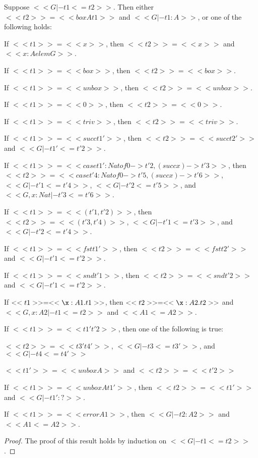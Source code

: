 \begin{lemma}
  \label{lemma:inversion_for_term_precision_for_core_grady}
  Suppose $<<G |- t1 <= t2>>$.  Then either $<<t2>> = <<box A t1>>$ and $<<G |- t1 : A>>$, or
  one of the following holds:
  \begin{enumR} \small
  \item If $<<t1>> = <<x>>$, then $<<t2>> = <<x>>$ and $<<x : A elem G>>$.

  \item If $<<t1>> = <<box>>$, then $<<t2>> = <<box>>$.

  \item If $<<t1>> = <<unbox>>$, then $<<t2>> = <<unbox>>$.

  \item If $<<t1>> = <<0>>$, then $<<t2>> = <<0>>$.

  \item If $<<t1>> = <<triv>>$, then $<<t2>> = <<triv>>$.

  \item If $<<t1>> = <<succ t1'>>$, then $<<t2>> = <<succ t2'>>$ and $<<G |- t1' <= t'2>>$.

  \item If $<<t1>> = <<case t1' : Nat of 0 -> t'2, (succ x) -> t'3>>$,
    then $<<t2>> = <<case t'4 : Nat of 0 -> t'5, (succ x) -> t'6>>$,
      $<<G |- t'1 <= t'4>>$, $<<G |- t'2 <= t'5>>$, and $<<G, x : Nat |- t'3 <= t'6>>$.

  \item If $<<t1>> = <<(t'1,t'2)>>$, then $<<t2>> = <<(t'3,t'4)>>$, $<<G |- t'1 <= t'3>>$, and $<<G |- t'2 <= t'4>>$.

  \item If $<<t1>> = <<fst t1'>>$, then $<<t2>> = <<fst t2'>>$ and $<<G |- t'1 <= t'2>>$.

  \item If $<<t1>> = <<snd t'1>>$, then $<<t2>> = <<snd t'2>>$ and $<<G |- t'1 <= t'2>>$.

  \item If $<<t1>> = <<\x:A1.t1>>$, then $<<t2>> = <<\x:A2.t2>>$ and $<<G, x : A2 |- t1 <= t2>>$ and $<<A1 <= A2>>$.

  \item If $<<t1>> = <<t1' t'2>>$, then one of the following is true:
    \begin{enumA}
    \item $<<t2>> = <<t3' t4'>>$, $<<G |- t3 <= t3'>>$, and $<<G |- t4 <= t4'>>$
    \item $<<t1'>> = <<unbox A>>$ and $<<t2>> = <<t'2>>$
    \end{enumA}
    
  \item If $<<t1>> = <<unbox A t1'>>$,
    then $<<t2>> = <<t1'>>$ and $<<G |- t1' : ?>>$.

  \item If $<<t1>> = <<error A1>>$,
    then $<<G |- t2 : A2>>$ and $<<A1 <= A2>>$.
  \end{enumR}
\end{lemma}
\begin{proof}
  The proof of this result holds by induction
  on $<<G |- t1 <= t2>>$.
\end{proof}
